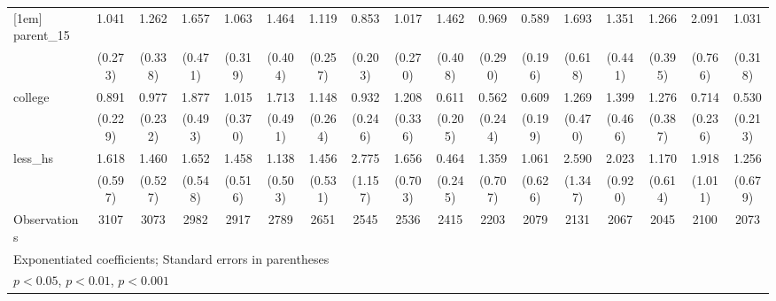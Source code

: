 {\begin{tabular}{l*{16}{c}}
[1em]
parent\_15           &       1.041         &       1.262         &       1.657         &       1.063         &       1.464         &       1.119         &       0.853         &       1.017         &       1.462         &       0.969         &       0.589         &       1.693         &       1.351         &       1.266         &       2.091\sym{*}  &       1.031         \\
                    &     (0.273)         &     (0.338)         &     (0.471)         &     (0.319)         &     (0.404)         &     (0.257)         &     (0.203)         &     (0.270)         &     (0.408)         &     (0.290)         &     (0.196)         &     (0.618)         &     (0.441)         &     (0.395)         &     (0.766)         &     (0.318)         \\
[1em]
college             &       0.891         &       0.977         &       1.877\sym{*}  &       1.015         &       1.713         &       1.148         &       0.932         &       1.208         &       0.611         &       0.562         &       0.609         &       1.269         &       1.399         &       1.276         &       0.714         &       0.530         \\
                    &     (0.229)         &     (0.232)         &     (0.493)         &     (0.370)         &     (0.491)         &     (0.264)         &     (0.246)         &     (0.336)         &     (0.205)         &     (0.244)         &     (0.199)         &     (0.470)         &     (0.466)         &     (0.387)         &     (0.236)         &     (0.213)         \\
[1em]
less\_hs             &       1.618         &       1.460         &       1.652         &       1.458         &       1.138         &       1.456         &       2.775\sym{*}  &       1.656         &       0.464         &       1.359         &       1.061         &       2.590         &       2.023         &       1.170         &       1.918         &       1.256         \\
                    &     (0.597)         &     (0.527)         &     (0.548)         &     (0.516)         &     (0.503)         &     (0.531)         &     (1.157)         &     (0.703)         &     (0.245)         &     (0.707)         &     (0.626)         &     (1.347)         &     (0.920)         &     (0.614)         &     (1.011)         &     (0.679)         \\
\hline
Observations        &        3107         &        3073         &        2982         &        2917         &        2789         &        2651         &        2545         &        2536         &        2415         &        2203         &        2079         &        2131         &        2067         &        2045         &        2100         &        2073         \\
\hline\hline
\multicolumn{17}{l}{\footnotesize Exponentiated coefficients; Standard errors in parentheses}\\
\multicolumn{17}{l}{\footnotesize \sym{*} \(p<0.05\), \sym{**} \(p<0.01\), \sym{***} \(p<0.001\)}\\
\end{tabular}
}
